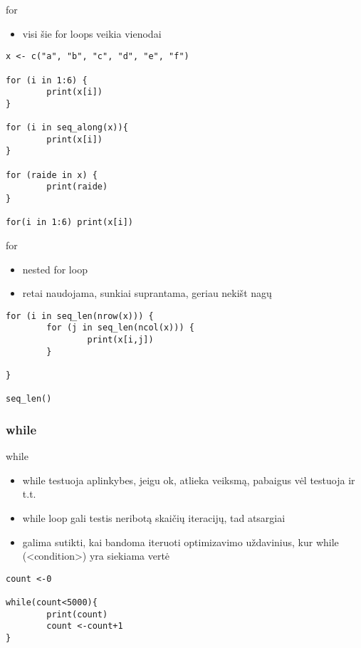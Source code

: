\documentclass[11pt,xcolor=table]{beamer}
\begin{document}

\begin{frame}[fragile]{for}
\begin{itemize}
\item visi šie for loops veikia vienodai
\end{itemize}
\begin{lstlisting}
x <- c("a", "b", "c", "d", "e", "f")

for (i in 1:6) {
        print(x[i])
}

for (i in seq_along(x)){
        print(x[i])
}

for (raide in x) {
        print(raide)
}

for(i in 1:6) print(x[i])
\end{lstlisting}
\end{frame}


\begin{frame}[fragile]{for}
\begin{itemize}
\item nested for loop
\item retai naudojama, sunkiai suprantama, geriau nekišt nagų 
\end{itemize}
\begin{lstlisting}
for (i in seq_len(nrow(x))) {
        for (j in seq_len(ncol(x))) {
                print(x[i,j])
        }
        
}

seq_len()
\end{lstlisting}
\end{frame}

\subsubsection{while}
\begin{frame}[fragile]{while}
\begin{itemize}
\item while testuoja aplinkybes, jeigu ok, atlieka veiksmą, pabaigus vėl testuoja ir t.t. 
\item while loop gali testis neribotą skaičių iteracijų, tad atsargiai
\item galima sutikti, kai bandoma iteruoti optimizavimo uždavinius, kur while (<condition>) yra siekiama vertė
\end{itemize}
\begin{lstlisting}
count <-0

while(count<5000){
        print(count)
        count <-count+1
}

\end{lstlisting}
\end{frame}
\end{document}
